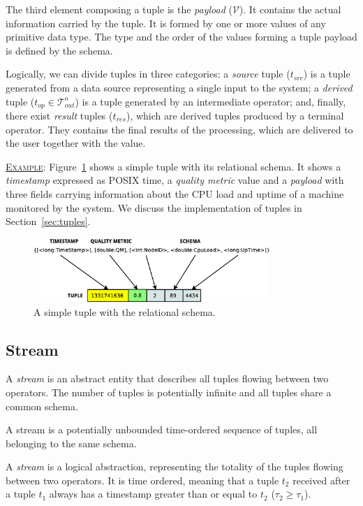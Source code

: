 The third element composing a tuple is the \textit{payload} ($\mathcal{V}$). It contains the actual
information carried by the tuple. It is formed by one or more values of any primitive data type. 
The type and the order of the values forming a tuple payload is defined by the schema.

Logically, we can divide tuples in three categories: a \textit{source} tuple ($t_{src}$) is a tuple
generated from a data source representing a single input to the system; a \textit{derived} tuple ($t_{op}
\in \mathcal{T}_{out}^{o}$) is a tuple generated by an intermediate operator; and, finally, there exist
\textit{result} tuples ($t_{res}$), which are derived tuples produced by a terminal operator. They
contains the final results of the processing, which are delivered to the user together with the \qm
value.

\underline{\textsc{Example}}: Figure~\ref{fig:tuple} shows a simple tuple with its relational schema.
It shows a \emph{timestamp} expressed as POSIX time, a \emph{quality metric} value and a \emph{payload}
with three fields carrying information about the CPU load and uptime of a machine monitored by the system.
We discuss the implementation of tuples in Section~\ref{sec:tuples}.
\begin{figure}[t]
	\centering
	\includegraphics[width=0.8\textwidth]{img/tesi/tuple}
	\caption{A simple tuple with the relational schema.}
	\label{fig:tuple}
\end{figure}
\vspace{-10pt}
\subsection*{Stream}
A \emph{stream} is an abstract entity that describes all tuples flowing between two
operators. The number of tuples is potentially infinite and all tuples share a common schema.
\begin{definition}[Stream] {
A stream is a potentially unbounded time-ordered sequence of tuples, all belonging to the same schema.}
\end{definition}
A \textit{stream} is a logical abstraction, representing the totality of the
tuples flowing between two operators. It is time ordered, meaning that a tuple $t_2$ received after a
tuple $t_1$ always has a timestamp greater than or equal to $t_2$ (\ie $\tau_2 \geq \tau_1$).


